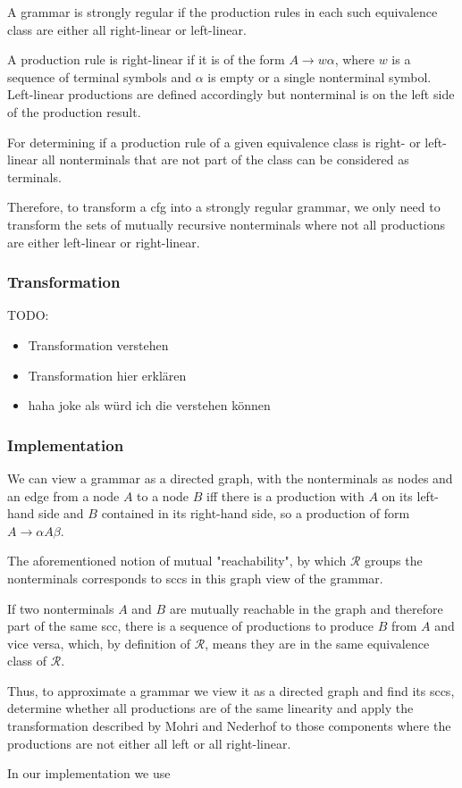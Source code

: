 A grammar is strongly regular if the production rules in each such equivalence class are either all right-linear or left-linear.

A production rule is right-linear if it is of the form $A \rightarrow w \alpha$, where $w$ is a sequence of terminal symbols and $\alpha$ is empty or a single nonterminal symbol. Left-linear productions are defined accordingly but nonterminal is on the left side of the production result.

For determining if a production rule of a given equivalence class is right- or left-linear all nonterminals that are not part of the class can be considered as terminals.

Therefore, to transform a \ac{cfg} into a strongly regular grammar, we only need to transform the sets of 
mutually recursive nonterminals where not all productions are either left-linear or right-linear.

\subsubsection{Transformation}

TODO:
\begin{itemize}
	\item Transformation verstehen
	\item Transformation hier erklären
	\item haha joke als würd ich die verstehen können
\end{itemize}

\subsubsection{Implementation}

We can view a grammar as a directed graph, with the nonterminals as nodes and an edge from a node $A$ to a node $B$ iff there is a production with $A$ on its left-hand side and $B$ contained in its right-hand side, so a production of form $A \rightarrow \alpha A \beta$.

The aforementioned notion of mutual "reachability", by which $\mathcal{R}$ groups the nonterminals corresponds to \acp{scc} in this graph view of the grammar.

If two nonterminals $A$ and $B$ are mutually reachable in the graph and therefore part of the same \ac{scc}, there is a sequence of productions to produce $B$ from $A$ and vice versa, which, by definition of $\mathcal{R}$, means they are in the same equivalence class of $\mathcal{R}$.

Thus, to approximate a grammar we view it as a directed graph and find its \acp{scc}, determine whether all productions are of the same linearity and apply the transformation described by Mohri and Nederhof to those components where the productions are not either all left or all right-linear.

In our implementation we use 


